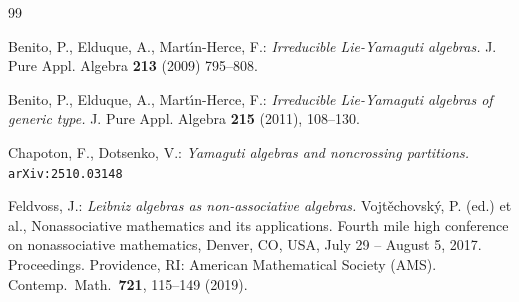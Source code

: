 \documentclass [11pt] {article}
\theoremstyle{definition}
\begin{document}
\begin{small}

\begin{thebibliography}{99}


    
 Benito, P.,  Elduque,  A.,   Mart\'{\i}n-Herce,  F.: \textit{Irreducible Lie-Yamaguti algebras.} J. Pure Appl. Algebra \textbf{213} (2009) 795--808.


 Benito, P.,  Elduque,  A.,   Mart\'{\i}n-Herce,  F.: \textit{Irreducible Lie-Yamaguti algebras of generic type.} J. Pure Appl. Algebra \textbf{215} (2011), 108--130.



      



  Chapoton, F., Dotsenko, V.:
  \textit{Yamaguti algebras and noncrossing partitions.}
         {\tt arXiv:2510.03148}


 Feldvoss, J.:
\textit{Leibniz algebras as non-associative algebras.}
Vojt\v{e}chovsk\'{y}, P. (ed.) et al., Nonassociative mathematics and its applications.
Fourth mile high conference on nonassociative mathematics, Denver, CO, USA, July 29 -- August 5,
2017. Proceedings. Providence, RI: American Mathematical Society (AMS). 
Contemp.~Math.~\textbf{721},
115--149 (2019). 



\end{thebibliography}
\end{small}
\end{document}
